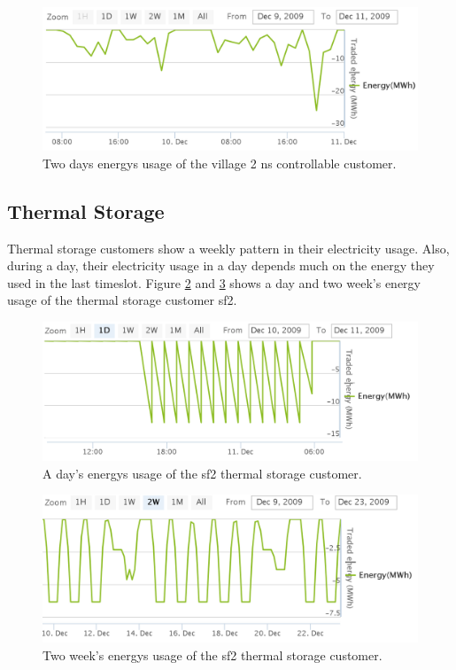 \begin{figure}[h!]
  \includegraphics[width=\linewidth]{village2nsControllable.png}
  \caption{Two days energys usage of the village 2 ns controllable customer.}
  \label{fig:2weekOffice}
\end{figure}

\subsection{Thermal Storage}
Thermal storage customers show a weekly pattern in their electricity usage. Also, during a day, their electricity usage in a day depends  much on the energy they used in the last timeslot. Figure \ref{fig:day-thermal} and \ref{fig:thermal-week} shows a day and two week's energy usage of the thermal storage customer sf2.

\begin{figure}[h!]
  \includegraphics[width=\linewidth]{sf2-thermal-daily.png}
  \caption{A day's energys usage of the sf2 thermal storage customer.}
  \label{fig:day-thermal}
\end{figure}

\begin{figure}[h!]
  \includegraphics[width=\linewidth]{sf2-thermal-week.png}
  \caption{Two week's energys usage of the sf2 thermal storage customer.}
  \label{fig:thermal-week}
\end{figure}


